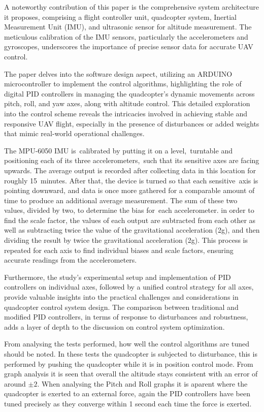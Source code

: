\documentclass{article}
\begin{document}
A noteworthy contribution of this paper is the comprehensive system architecture
it proposes, comprising a flight controller unit, quadcopter system, Inertial
Measurement Unit (IMU), and ultrasonic sensor for altitude measurement. The
meticulous calibration of the IMU sensors, particularly the accelerometers and
gyroscopes, underscores the importance of precise sensor data for accurate UAV
control.

The paper delves into the software design aspect, utilizing an ARDUINO
microcontroller to implement the control algorithms, highlighting the role of
digital PID controllers in managing the quadcopter's dynamic movements across
pitch, roll, and yaw axes, along with altitude control. This detailed
exploration into the control scheme reveals the intricacies involved in
achieving stable and responsive UAV flight, especially in the presence of
disturbances or added weights that mimic real-world operational challenges.

The MPU-6050 IMU is calibrated by putting it on a level, turntable and
positioning each of its three accelerometers, such that its sensitive axes are
facing upwards. The average output is recorded after collecting data in this
location for roughly 15 minutes. After that, the device is turned so that each
sensitive axis is pointing downward, and data is once more gathered for a
comparable amount of time to produce an additional average measurement. The sum
of these two values, divided by two, to determine the bias for each
accelerometer. in order to find the scale factor, the values of each output are
subtracted from each other as well as subtracting twice the value of the
gravitational acceleration (2g), and then dividing the result by twice the
gravitational acceleration (2g). This process is repeated for each axis to find
individual biases and scale factors, ensuring accurate readings from the
accelerometers.

Furthermore, the study's experimental setup and implementation of PID
controllers on individual axes, followed by a unified control strategy for all
axes, provide valuable insights into the practical challenges and considerations
in quadcopter control system design. The comparison between traditional and
modified PID controllers, in terms of response to disturbances and robustness,
adds a layer of depth to the discussion on control system optimization.

From analysing the tests performed, how well the control algorithms are tuned
should be noted. In these tests the quadcopter is subjected to disturbance, this
is performed by pushing the quadcopter while it is in position control mode.
From graph analysis it is seen that overall the altitude stays consistent with
an error of around \(\pm2\). When analysing the Pitch and Roll graphs it is
aparent where the quadcopter is exerted to an external force, again the PID
controllers have been tuned precisely as they converge within 1 second each time
the force is exerted. 
\end{document}
